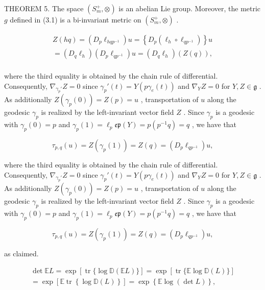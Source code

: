 \documentclass[11pt]{article}
\begin{document}
THEOREM 5. The space  $(S_m^+, \otimes)$  is an abelian Lie group. Moreover, the metric  $g$  defined in (3.1) is a bi-invariant metric on  $(S_m^+, \otimes)$ .

$$
\begin{array}{l} Z (h q) = \left(D _ {p} \ell_ {h q p ^ {- 1}}\right) u = \left\{D _ {p} \left(\ell_ {h} \circ \ell_ {q p ^ {- 1}}\right) \right\} u \\ = \left(D _ {q} \ell_ {h}\right) \left(D _ {p} \ell_ {q p ^ {- 1}}\right) u = \left(D _ {q} \ell_ {h}\right) (Z (q)), \\ \end{array}
$$

where the third equality is obtained by the chain rule of differential. Consequently,  $\nabla_{\gamma_p'}Z = 0$  since  $\gamma_p'(t) = Y(p\gamma_e(t))$  and  $\nabla_Y Z = 0$  for  $Y,Z\in \mathfrak{g}$ . As additionally  $Z(\gamma_p(0)) = Z(p) = u$ , transportation of  $u$  along the geodesic  $\gamma_{p}$  is realized by the left-invariant vector field  $Z$ . Since  $\gamma_{p}$  is a geodesic with  $\gamma_p(0) = p$  and  $\gamma_p(1) = \ell_p\mathfrak{e}\mathfrak{p}(Y) = p(p^{-1}q) = q$ , we have that

$$
\tau_ {p, q} (u) = Z \left(\gamma_ {p} (1)\right) = Z (q) = \left(D _ {p} \ell_ {q p ^ {- 1}}\right) u,
$$

where the third equality is obtained by the chain rule of differential. Consequently,  $\nabla_{\gamma_p'}Z = 0$  since  $\gamma_p'(t) = Y(p\gamma_e(t))$  and  $\nabla_Y Z = 0$  for  $Y,Z\in \mathfrak{g}$ . As additionally  $Z(\gamma_p(0)) = Z(p) = u$ , transportation of  $u$  along the geodesic  $\gamma_{p}$  is realized by the left-invariant vector field  $Z$ . Since  $\gamma_{p}$  is a geodesic with  $\gamma_p(0) = p$  and  $\gamma_p(1) = \ell_p\mathfrak{e}\mathfrak{p}(Y) = p(p^{-1}q) = q$ , we have that

$$
\tau_ {p, q} (u) = Z \left(\gamma_ {p} (1)\right) = Z (q) = \left(D _ {p} \ell_ {q p ^ {- 1}}\right) u,
$$

as claimed.

$$
\begin{array}{l} \det  \mathbb {E} L = \exp [ \operatorname {t r} \{\log \mathbb {D} (\mathbb {E} L) \} ] = \exp [ \operatorname {t r} \{\mathbb {E} \log \mathbb {D} (L) \} ] \\ = \exp \left[ \mathbb {E} \operatorname {t r} \left\{\log \mathbb {D} (L) \right\} \right] = \exp \left\{\mathbb {E} \log (\det  L) \right\}, \\ \end{array}
$$
\end{document}
